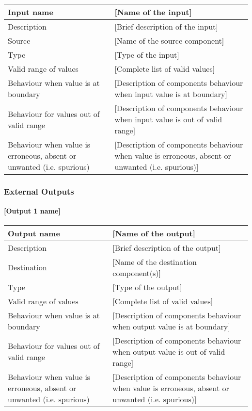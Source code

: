 \begin{longtable}{p{}p{}}
\toprule
Input name				& [Name of the input] \\
\midrule
Description				& [Brief description of the input] \\
\midrule
Source					& [Name of the source component] \\ 
\midrule
Type					& [Type of the input] \\
\midrule
Valid range of values	& [Complete list of valid values] \\
\midrule
Behaviour when value is at boundary	& [Description of components behaviour when input value is at boundary] \\
\midrule
Behaviour for values out of valid range	& [Description of components behaviour when input value is out of valid range] \\
\midrule
Behaviour when value is erroneous, absent or unwanted (i.e. spurious) & [Description of components behaviour when value is erroneous, absent or unwanted (i.e. spurious)] \\
\bottomrule
\end{longtable}


\subsubsection{External Outputs}

\paragraph{[Output 1 name]}

\begin{longtable}{p{}p{}}
\toprule
Output name				& [Name of the output] \\
\midrule
Description				& [Brief description of the output] \\
\midrule
Destination				& [Name of the destination component(s)] \\ 
\midrule
Type					& [Type of the output] \\
\midrule
Valid range of values	& [Complete list of valid values] \\
\midrule
Behaviour when value is at boundary	& [Description of components behaviour when output value is at boundary] \\
\midrule
Behaviour for values out of valid range	& [Description of components behaviour when output value is out of valid range] \\
\midrule
Behaviour when value is erroneous, absent or unwanted (i.e. spurious) & [Description of components behaviour when value is erroneous, absent or unwanted (i.e. spurious)] \\
\bottomrule
\end{longtable}


